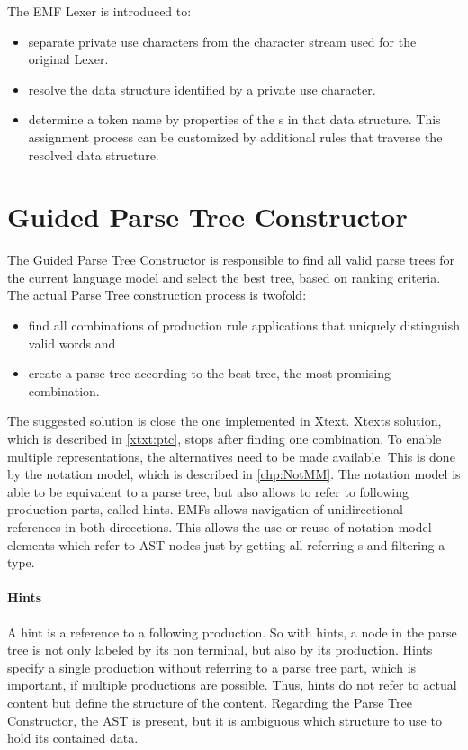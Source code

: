 The EMF Lexer is introduced to:
\begin{itemize}
	\item separate private use characters from the character stream used for the original Lexer.
	\item resolve the data structure identified by a private use character.
	\item determine a token name by properties of the s in that data structure. This assignment process can be customized by additional rules that traverse the resolved data structure.
\end{itemize}










\section{Guided Parse Tree Constructor}
The Guided Parse Tree Constructor is responsible to find all valid parse trees for the current language model and select the best tree, based on ranking criteria. The actual Parse Tree construction process is twofold:
\begin{itemize}
	\item find all combinations of production rule applications that uniquely distinguish valid words and
	\item create a parse tree according to the best tree, the most promising combination.
\end{itemize}
 
The suggested solution is close the one implemented in Xtext. Xtexts solution, which is described in \ref{xtxt:ptc}, stops after finding one combination. 
To enable multiple representations, the alternatives need to be made available. This is done by the notation model, which is described in \ref{chp:NotMM}. The notation model is able to be equivalent to a parse tree, but also allows to refer to following production parts, called hints. EMFs  allows navigation of unidirectional references in both direections. This allows the use or reuse of notation model elements which refer to AST nodes just by getting all referring s and filtering a type.


\paragraph{Hints}
A hint is a reference to a following production. So with hints, a node in the parse tree is not only labeled by its non terminal, but also by its production. Hints specify a single production without referring to a parse tree part, which is important, if multiple productions are possible. Thus, hints do not refer to actual content but define the structure of the content. Regarding the Parse Tree Constructor, the AST is present, but it is ambiguous which structure to use to hold its contained data.  

